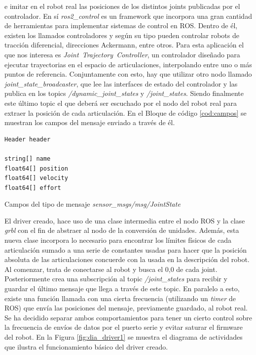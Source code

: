 e imitar en el robot real las posiciones de los distintos joints publicadas por el controlador. En sí \mbox{\textit{ros2\_control}} es un 
framework que incorpora una gran cantidad de herramientas para implementar sistemas de control en ROS. Dentro de él, existen los llamados 
controladores y según su tipo pueden controlar robots de tracción diferencial, direcciones Ackermann, entre otros. Para esta aplicación el que nos 
interesa es \mbox{\textit{Joint Trajectory Controller}}, un controlador diseñado para ejecutar trayectorias en el espacio de 
articulaciones, interpolando entre uno o más puntos de referencia. Conjuntamente con esto, hay que 
utilizar otro nodo llamado \textit{joint\_state\_broadcaster}, que lee las interfaces de estado del controlador y las publica en los topics
\textit{/dynamic\_joint\_states} y \textit{/joint\_states}. Siendo finalmente este último topic el que deberá ser escuchado por el 
nodo del robot real para extraer la posición 
de cada articulación. En el Bloque de código \ref{cod:campos} se muestran los campos del mensaje enviado a través 
de él.

\begin{code}[h]
\begin{lstlisting}
Header header

string[] name
float64[] position
float64[] velocity
float64[] effort
\end{lstlisting}
\caption{Campos del tipo de mensaje \mbox{\textit{sensor\_msgs/msg/JointState}}}
\label{cod:campos}
\end{code}

El driver creado, hace uso de una clase intermedia entre el nodo ROS y la clase \textit{grbl} con el fin de abstraer al nodo de la conversión 
de unidades. Además, esta nueva clase incorpora lo necesario para encontrar los límites físicos de cada articulación sumado a una serie de 
constantes usadas para hacer que la posición absoluta de las articulaciones concuerde con la usada en la descripción del robot. \\

Al comenzar, trata 
de conectarse al robot y busca el 0,0 de cada joint. Posteriormente crea una subscripción al topic \textit{/joint\_states} para recibir y 
guardar el último mensaje que llega a través de  este topic. En paralelo a esto, existe una función llamada con una cierta frecuencia (utilizando un 
\textit{timer} de ROS) que envía las posiciones del mensaje, previamente guardado, al robot real. Se ha decidido separar ambos comportamientos 
para tener un cierto control sobre la frecuencia de envíos de datos por el puerto serie y evitar saturar el firmware del robot. 
\newpage
En la Figura \ref{fig:dia_driver1} se muestra el diagrama de actividades que ilustra el funcionamiento básico del driver creado.\\
\\


